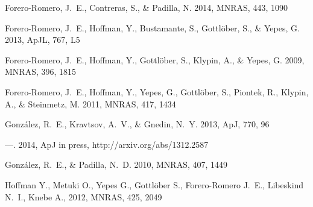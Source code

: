 \documentclass{iau}
\newcommand{\apj}{ApJ}
\newcommand{\apjl}{ApJL}
\newcommand{\mnras}{MNRAS}
\begin{document}
\begin{thebibliography}{}


{Forero-Romero}, J.~E., {Contreras}, S., \& {Padilla}, N. 2014, \mnras, 443,
1090

{Forero-Romero}, J.~E., {Hoffman}, Y., {Bustamante}, S., {Gottl{\"o}ber}, S.,
\& {Yepes}, G. 2013, \apjl, 767, L5

{Forero-Romero}, J.~E., {Hoffman}, Y., {Gottl{\"o}ber}, S., {Klypin}, A., \&
{Yepes}, G. 2009, \mnras, 396, 1815

{Forero-Romero}, J.~E., {Hoffman}, Y., {Yepes}, G., {Gottl{\"o}ber}, S.,
{Piontek}, R., {Klypin}, A., \& {Steinmetz}, M. 2011, \mnras, 417, 1434

{Gonz{\'a}lez}, R.~E., {Kravtsov}, A.~V., \& {Gnedin}, N.~Y. 2013, \apj, 770,
96

---. 2014, ApJ in press, http://arxiv.org/abs/1312.2587

{Gonz{\'a}lez}, R.~E., \& {Padilla}, N.~D. 2010, \mnras, 407, 1449


 {Hoffman} Y., {Metuki} O., {Yepes}
  G., {Gottl{\"o}ber} S., {Forero-Romero} J.~E., {Libeskind} N.~I.,
  {Knebe} A., 2012, \mnras, 425, 2049 

\end{thebibliography}
\end{document}
